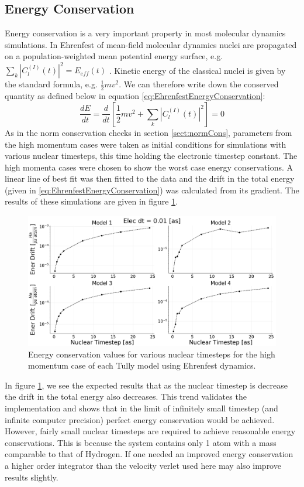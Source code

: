 \subsection{Energy Conservation}
Energy conservation is a very important property in most molecular dynamics simulations. In Ehrenfest of mean-field molecular dynamics nuclei are propagated on a population-weighted mean potential energy surface, e.g. $\sum_{k}|C_{l}^{(I)}(t)|^2 = E_{eff}(t)$ \cite{EhrenEnerCons}. Kinetic energy of the classical nuclei is given by the standard formula, e.g. $\frac{1}{2} m v^2$. We can therefore write down the conserved quantity as defined below in equation \eqref{eq:EhrenfestEnergyConservation}:
\begin{equation}
  \frac{d E}{dt} = \frac{d}{dt} \left[ \frac{1}{2} m v^2 + \sum_{k}|C_{l}^{(I)}(t)|^2 \right] = 0
  \label{eq:EhrenfestEnergyConservation}
\end{equation}
As in the norm conservation checks in section \ref{sect:normCons},  parameters from the high momentum cases were taken as initial conditions for simulations with various nuclear timesteps, this time holding the electronic timestep constant. The high momenta cases were chosen to show the worst case energy conservations. A linear line of best fit was then fitted to the data and the drift in the total energy (given in \eqref{eq:EhrenfestEnergyConservation}) was calculated from its gradient. The results of these simulations are given in figure \ref{fig:EhrenEnerCons}.
\begin{figure}[ht]
  \includegraphics[width=\textwidth]{./img/CTMQC/TullyModels/Ehren_EnerCons.png}
  \caption{\label{fig:EhrenEnerCons}Energy conservation values for various nuclear timesteps for the high momentum case of each Tully model using Ehrenfest dynamics.}
\end{figure}
In figure \ref{fig:EhrenEnerCons}, we see the expected results that as the nuclear timestep is decrease the drift in the total energy also decreases. This trend validates the implementation and shows that in the limit of infinitely small timestep (and infinite computer precision) perfect energy conservation would be achieved. However, fairly small nuclear timesteps are required to achieve reasonable energy conservations. This is because the system contains only 1 atom with a mass comparable to that of Hydrogen. If one needed an improved energy conservation a higher order integrator than the velocity verlet used here may also improve results slightly.


